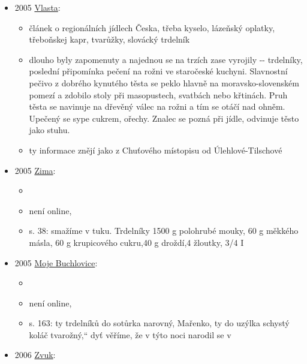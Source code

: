 \begin{itemize}
  \begin{itemize}
  \tightlist
  \item
    není online, 
  \item
    s. 123, vyráběli Jiranovi nejrůznější speciality, například krásné
    fondánové figurky, trdelníky, originální bonbony a další dobroty
  \end{itemize}
\item
  2005
  \href{https://www.digitalniknihovna.cz/mzk/uuid/uuid:46367401-f028-11e5-87ba-5ef3fc9bb22f}{Vlasta}:

  \begin{itemize}
  \tightlist
  \item
    článek o regionálních jídlech Česka, třeba kyselo, lázeňský oplatky,
    třeboňskej kapr, tvarůžky, slovácký trdelník
  \item
    dlouho byly zapomenuty a najednou se na trzích zase vyrojily -\/-
    trdelníky, poslední připomínka pečení na rožni ve staročeské
    kuchyni. Slavnostní pečivo z dobrého kynutého těsta se peklo hlavně
    na moravsko-slovenském pomezí a zdobilo stoly při masopustech,
    svatbách nebo křtinách. Pruh těsta se navinuje na dřevěný válec na
    rožni a tím se otáčí nad ohněm. Upečený se sype cukrem, ořechy.
    Znalec se pozná při jídle, odvinuje těsto jako stuhu.
  \item
    ty informace znějí jako z Chuťového místopisu od Úlehlové-Tilschové
  \end{itemize}
\item
  2005
  \href{https://www.digitalniknihovna.cz/mzk/uuid/uuid:50426a30-6be9-11e5-b4b4-005056827e51}{Zima}:

  \begin{itemize}
  \tightlist
  \item
  \item
    není online, 
  \item
    s. 38: smažíme v tuku. Trdelníky 1500 g polohrubé mouky, 60 g
    měkkého másla, 60 g krupicového cukru,40 g droždí,4 žloutky, 3/4 I
  \end{itemize}
\item
  2005
  \href{https://www.digitalniknihovna.cz/mzk/uuid/uuid:79238390-8508-11e3-a606-005056827e51}{Moje
  Buchlovice}:

  \begin{itemize}
  \tightlist
  \item
     
  \item
    není online, 
  \item
    s. 163: ty trdelníků do sotůrka narovný, Mařenko, ty do uzýlka
    schystý koláč tvarožný,`` dyť věříme, že v týto noci narodil se v
  \end{itemize}
\item
  2006
  \href{https://ceskadigitalniknihovna.cz/uuid/uuid:d3bddf00-5ca4-11eb-a728-5ef3fc9bb22f}{Zvuk}:


\end{itemize}
